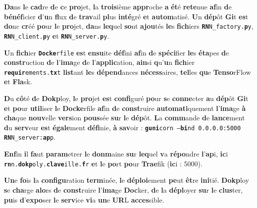 \documentclass{rapportClass} %
\begin{document}
\textbf{Da}ns \textbf{l}e \textbf{cad}re \textbf{d}e \textbf{c}e \textbf{pro}jet, \textbf{l}a \textbf{trois}ième \textbf{appr}oche \textbf{a} \textbf{ét}é \textbf{rete}nue \textbf{af}in \textbf{d}e \textbf{bénéf}icier \textbf{d}’\textbf{u}n \textbf{fl}ux \textbf{d}e \textbf{trav}ail \textbf{pl}us \textbf{inté}gré \textbf{e}t \textbf{autom}atisé. 
\textbf{U}n \textbf{dép}ôt \textbf{Gi}t \textbf{es}t \textbf{do}nc \textbf{cr}éé \textbf{po}ur \textbf{l}e \textbf{pro}jet, \textbf{da}ns \textbf{leq}uel \textbf{so}nt \textbf{ajou}tés \textbf{le}s \textbf{fich}iers \texttt{\textbf{RN}N_factory.\textbf{p}y}, \texttt{\textbf{RN}N_client.\textbf{p}y} \textbf{e}t 
\texttt{\textbf{RN}N_server.\textbf{p}y}.

\textbf{U}n \textbf{fich}ier \texttt{\textbf{Docke}rfile} \textbf{es}t \textbf{ensu}ite \textbf{déf}ini \textbf{af}in \textbf{d}e \textbf{spéci}fier \textbf{le}s \textbf{éta}pes \textbf{d}e \textbf{constr}uction \textbf{d}e \textbf{l}’\textbf{ima}ge \textbf{d}e \textbf{l}’\textbf{applic}ation, 
\textbf{ain}si \textbf{q}u’\textbf{u}n \textbf{fich}ier \texttt{\textbf{requir}ements.\textbf{tx}t} \textbf{list}ant \textbf{le}s \textbf{dépend}ances \textbf{nécess}aires, \textbf{tel}les \textbf{qu}e \textbf{Tenso}rFlow \textbf{e}t \textbf{Fla}sk.

\textbf{D}u \textbf{cô}té \textbf{d}e \textbf{Dokp}loy, \textbf{l}e \textbf{pro}jet \textbf{es}t \textbf{confi}guré \textbf{po}ur \textbf{s}e \textbf{conne}cter \textbf{a}u \textbf{dép}ôt \textbf{Gi}t \textbf{e}t \textbf{po}ur \textbf{util}iser \textbf{l}e \textbf{Docke}rfile \textbf{af}in \textbf{d}e \textbf{const}ruire 
\textbf{automati}quement \textbf{l}’\textbf{ima}ge \textbf{à} \textbf{cha}que \textbf{nouv}elle \textbf{vers}ion \textbf{pous}sée \textbf{su}r \textbf{l}e \textbf{dép}ôt. \textbf{L}a \textbf{comm}ande \textbf{d}e \textbf{lance}ment \textbf{d}u \textbf{serv}eur \textbf{es}t \textbf{égale}ment \textbf{défi}nie, 
\textbf{à} \textbf{sav}oir : \texttt{\textbf{guni}corn --\textbf{bi}nd 0.0.0.0:5000 \textbf{RN}N_server:\textbf{ap}p}.

\textbf{Enf}in \textbf{i}l \textbf{fa}ut \textbf{param}etrer \textbf{l}e \textbf{donm}aine \textbf{su}r \textbf{leq}uel \textbf{v}a \textbf{répo}ndre \textbf{l}'\textbf{ap}i, \textbf{ic}i %
\texttt{\textbf{rn}n.\textbf{dokp}oly.\textbf{clave}ille.\textbf{f}r} \textbf{e}t \textbf{l}e \textbf{po}rt \textbf{po}ur \textbf{Trae}fik (\textbf{ic}i : 5000).

\textbf{Un}e \textbf{fo}is \textbf{l}a \textbf{configu}ration \textbf{term}inée, \textbf{l}e \textbf{déploi}ement \textbf{pe}ut \textbf{êt}re \textbf{ini}tié. \textbf{Dokp}loy \textbf{s}e \textbf{cha}rge \textbf{alo}rs \textbf{d}e \textbf{const}ruire \textbf{l}’\textbf{ima}ge \textbf{Doc}ker, 
\textbf{d}e \textbf{l}a \textbf{dépl}oyer \textbf{su}r \textbf{l}e \textbf{clus}ter, \textbf{pu}is \textbf{d}’\textbf{expo}ser \textbf{l}e \textbf{serv}ice \textbf{vi}a \textbf{un}e \textbf{UR}L \textbf{acces}sible.
\end{document}
